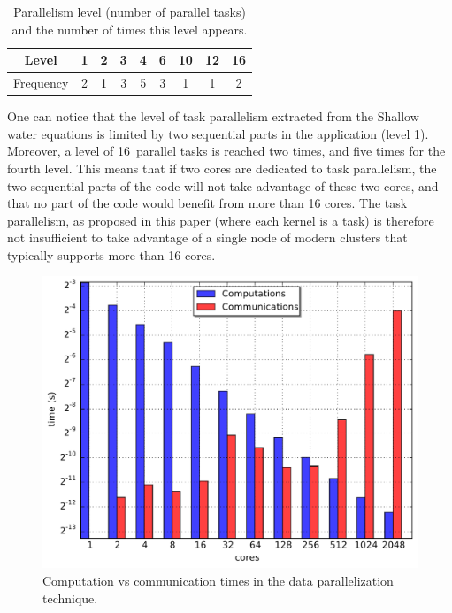 \begin{table}[th]
 \begin{center}
 \begin{tabular}{|c|c|c|c|c|c|c|c|c|}
   Level & 1 & 2 & 3 & 4 & 6 & 10 & 12 & 16\\
   \hline
   Frequency & 2 & 1 & 3 & 5 & 3 & 1 & 1 & 2\\
 \end{tabular}
\caption{Parallelism level (number of parallel tasks) and the number of times this level appears.}
\label{fig:freq}
 \end{center}
\end{table}

One can notice that the level of task parallelism extracted from the Shallow water equations is limited by two sequential parts in the application (level 1). Moreover, a level of 16~parallel tasks is reached two times, and five times for the fourth level.
This means that if two cores are dedicated to task parallelism, the two sequential parts of the code will not take advantage of these two cores, and that no part of the code would benefit from more than 16 cores. The task parallelism, as proposed in this paper (\ie where each kernel is a task) is therefore not insufficient to take advantage of a single node of modern clusters that typically supports more than 16 cores.

\begin{figure}[bh]\begin{center}
  \includegraphics[width=.6\textwidth]{../results/task_scaling/500_200/analytic/times.pdf}
  \caption{Computation vs communication times in the data parallelization technique.}
  \label{fig:limit}
\end{center}\end{figure}

